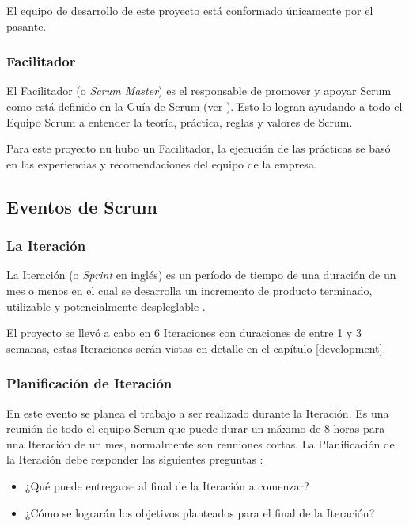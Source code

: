 El equipo de desarrollo de este proyecto está conformado únicamente por el pasante.

\subsubsection{Facilitador} \label{scrumMaster}
El Facilitador (o \emph{Scrum Master}) es el responsable de promover y apoyar Scrum como está definido en la Guía de Scrum (ver \cite{scrumSchwaber}). Esto lo logran ayudando a todo el Equipo Scrum a entender la teoría, práctica, reglas y valores de Scrum. \cite{scrumSchwaber}

Para este proyecto nu hubo un Facilitador, la ejecución de las prácticas se basó en las experiencias y recomendaciones del equipo de la empresa.

\subsection{Eventos de Scrum}
\subsubsection{La Iteración} \label{sprint}
La Iteración (o \emph{Sprint} en inglés) es un período de tiempo de una duración de un mes o menos en el cual se desarrolla un incremento de producto terminado, utilizable y potencialmente despleglable \cite{scrumSchwaber}.

El proyecto se llevó a cabo en 6 Iteraciones con duraciones de entre 1 y 3 semanas, estas Iteraciones serán vistas en detalle en el capítulo \ref{development}.

\subsubsection{Planificación de Iteración}
En este evento se planea el trabajo a ser realizado durante la Iteración. Es una reunión de todo el equipo Scrum que puede durar un máximo de 8 horas para una Iteración de un mes, normalmente son reuniones cortas. La Planificación de la Iteración debe responder las siguientes preguntas \cite{scrumSchwaber}:

\begin{itemize}
    \item ¿Qué puede entregarse al final de la Iteración a comenzar?
    \item ¿Cómo se lograrán los objetivos planteados para el final de la Iteración?
\end{itemize}

